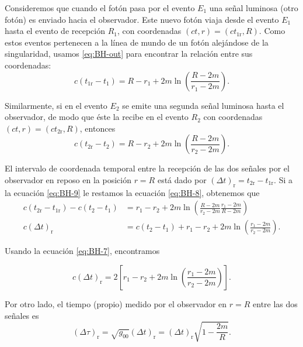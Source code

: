 \documentclass[letterpaper,11pt]{article}
\begin{document}
Consideremos que cuando el fotón pasa por el evento $E_1$ una señal luminosa (otro fotón) es enviado hacia el observador. Este nuevo fotón viaja desde el evento $E_1$ hasta el evento de recepción $R_1$, con coordenadas $(ct,r) = (ct_{1\text{r}},R)$. Como estos eventos pertenecen a la línea de mundo de un fotón alejándose de la singularidad, usamos \eqref{eq:BH-out} para encontrar la relación entre sus coordenadas:
\begin{equation}
c(t_{1\text{r}} -t_1) = R - r_1 + 2m \ln\left(\frac{R-2m}{r_1 - 2m}\right). \label{eq:BH-8}
\end{equation}

Similarmente, si en el evento $E_2$ se emite una segunda señal luminosa hasta el observador, de modo que éste la recibe en el evento $R_2$ con coordenadas $(ct,r) = (ct_{2\text{r}},R)$, entonces
\begin{equation}
c(t_{2\text{r}} -t_2) = R - r_2 + 2m \ln\left(\frac{R-2m}{r_2 - 2m}\right). \label{eq:BH-9}
\end{equation}

El intervalo de coordenada temporal entre la recepción de las dos señales por el observador en reposo en la posición $r = R$ está dado por $(\Delta t)_{\text{r}} = t_{2\text{r}} - t_{1\text{r}}$. Si a la ecuación \eqref{eq:BH-9} le restamos la ecuación \eqref{eq:BH-8}, obtenemos que
\begin{align}
c(t_{2\text{r}} - t_{1\text{r}}) - c (t_2 - t_1) &= r_1 - r_2 + 2m \ln\left( \frac{R-2m}{r_2 - 2m} \frac{r_1 - 2m}{R-2m}\right) \\
c(\Delta t)_{\text{r}} &=  c (t_2 - t_1) + r_1 - r_2 + 2m \ln\left( \frac{r_1 - 2m}{r_2 - 2m} \right).
\end{align}

Usando la ecuación \eqref{eq:BH-7}, encontramos
\begin{shaded}
\begin{equation}
c(\Delta t)_{\text{r}} = 2 \left[ r_1 - r_2 + 2m \ln\left( \frac{r_1 - 2m}{r_2 - 2m} \right) \right].
\end{equation}
\end{shaded}

Por otro lado, el tiempo (propio) medido por el observador en $r = R$ entre las dos señales es 
\begin{equation}
(\Delta \tau)_{\text{r}} = \sqrt{g_{00}} (\Delta t)_{\text{r}} = (\Delta t)_{\text{r}} \sqrt{1 - \frac{2m}{R}}.
\end{equation}
\end{document}
